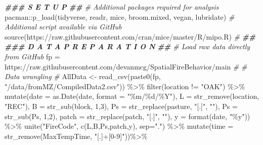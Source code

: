 \documentclass[
]{article}
\newenvironment{Shaded}{\begin{snugshade}}{\end{snugshade}}
\newcommand{\AttributeTok}[1]{\textcolor[rgb]{0.77,0.63,0.00}{#1}}
\newcommand{\CommentTok}[1]{\textcolor[rgb]{0.56,0.35,0.01}{\textit{#1}}}
\newcommand{\DecValTok}[1]{\textcolor[rgb]{0.00,0.00,0.81}{#1}}
\newcommand{\DocumentationTok}[1]{\textcolor[rgb]{0.56,0.35,0.01}{\textbf{\textit{#1}}}}
\newcommand{\FunctionTok}[1]{\textcolor[rgb]{0.00,0.00,0.00}{#1}}
\newcommand{\NormalTok}[1]{#1}
\newcommand{\OtherTok}[1]{\textcolor[rgb]{0.56,0.35,0.01}{#1}}
\newcommand{\SpecialCharTok}[1]{\textcolor[rgb]{0.00,0.00,0.00}{#1}}
\newcommand{\StringTok}[1]{\textcolor[rgb]{0.31,0.60,0.02}{#1}}
\begin{document}
\begin{Shaded}
\begin{Highlighting}[]
\DocumentationTok{\#\#\# S E T U P }
\DocumentationTok{\#\#}
\CommentTok{\# Additional packages required for analysis}
\NormalTok{  pacman}\SpecialCharTok{::}\FunctionTok{p\_load}\NormalTok{(tidyverse, readr, mice, broom.mixed, vegan, lubridate)}
\CommentTok{\# Additional script available via GitHub}
  \FunctionTok{source}\NormalTok{(}\StringTok{\textquotesingle{}https://raw.githubusercontent.com/cran/mice/master/R/mipo.R\textquotesingle{}}\NormalTok{)}
\CommentTok{\#}
\DocumentationTok{\#\#}
\DocumentationTok{\#\#\# D A T A   P R E P A R A T I O N}
\DocumentationTok{\#\#}
\CommentTok{\# Load raw data directly from GitHub}
\NormalTok{  fp }\OtherTok{=} \StringTok{\textquotesingle{}https://raw.githubusercontent.com/devanmcg/SpatialFireBehavior/main\textquotesingle{}}
\CommentTok{\#}
\CommentTok{\# Data wrangling}
\CommentTok{\#}
\NormalTok{ AllData }\OtherTok{\textless{}{-}}  
    \FunctionTok{read\_csv}\NormalTok{(}\FunctionTok{paste0}\NormalTok{(fp, }\StringTok{"/data/fromMZ/CompiledData2.csv"}\NormalTok{)) }\SpecialCharTok{\%\textgreater{}\%}
    \FunctionTok{filter}\NormalTok{(location }\SpecialCharTok{!=} \StringTok{"OAK"}\NormalTok{) }\SpecialCharTok{\%\textgreater{}\%}
      \FunctionTok{mutate}\NormalTok{(}\AttributeTok{date =} \FunctionTok{as.Date}\NormalTok{(date, }\AttributeTok{format =} \StringTok{"\%m/\%d/\%Y"}\NormalTok{),}
               \AttributeTok{L =} \FunctionTok{str\_remove}\NormalTok{(location, }\StringTok{"REC"}\NormalTok{), }
               \AttributeTok{B =} \FunctionTok{str\_sub}\NormalTok{(block, }\DecValTok{1}\NormalTok{,}\DecValTok{3}\NormalTok{), }
               \AttributeTok{Ps =} \FunctionTok{str\_replace}\NormalTok{(pasture, }\StringTok{"[.]"}\NormalTok{, }\StringTok{""}\NormalTok{), }
               \AttributeTok{Ps =} \FunctionTok{str\_sub}\NormalTok{(Ps, }\DecValTok{1}\NormalTok{,}\DecValTok{2}\NormalTok{), }
               \AttributeTok{patch =} \FunctionTok{str\_replace}\NormalTok{(patch, }\StringTok{"[.]"}\NormalTok{, }\StringTok{""}\NormalTok{),}
               \AttributeTok{y =} \FunctionTok{format}\NormalTok{(date, }\StringTok{"\%y"}\NormalTok{)) }\SpecialCharTok{\%\textgreater{}\%}
        \FunctionTok{unite}\NormalTok{(}\StringTok{"FireCode"}\NormalTok{, }\FunctionTok{c}\NormalTok{(L,B,Ps,patch,y), }\AttributeTok{sep=}\StringTok{"."}\NormalTok{) }\SpecialCharTok{\%\textgreater{}\%}
    \FunctionTok{mutate}\NormalTok{(}\AttributeTok{time =} \FunctionTok{str\_remove}\NormalTok{(MaxTempTime, }\StringTok{"[.]+[0{-}9]"}\NormalTok{))}\SpecialCharTok{\%\textgreater{}\%}

\end{Highlighting}
\end{Shaded}
\end{document}
